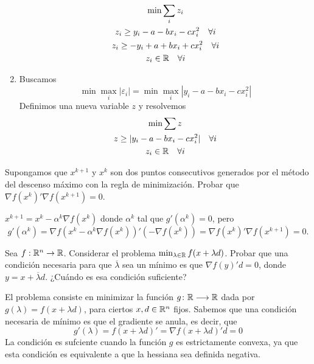 \documentclass[twoside]{article}
\begin{document}
\begin{ejercicio}{1}
\begin{solucion}
\begin{enumerate}
\begin{gather*}
\min \sum_i z_i\\
z_i\geq y_i -a-bx_i-c x_i^2 \quad \forall i \\
z_i\geq -y_i +a+bx_i+c x_i^2 \quad \forall i\\
z_i \in \mathbb{R} \quad \forall i
\end{gather*}
\item Buscamos
$$
\min \max_i |\varepsilon_i| = \min \max_i |y_i -a-bx_i-c x_i^2|
$$
Definimos una nueva variable $z$ y resolvemos
\begin{gather*}
\min \sum z\\
z\geq |y_i -a-bx_i-c x_i^2| \quad \forall i\\
z_i \in \mathbb{R} \quad \forall i
\end{gather*}
\end{enumerate}
\end{solucion}
\end{ejercicio}

\newpage 

\begin{ejercicio}{2}
Supongamos que $x^{k+1}$ y $x^k$ son dos puntos consecutivos generados por el método del descenso máximo con la regla de minimización. Probar que $\nabla f(x^{k})'\nabla f(x^{k+1})=0$.
\end{ejercicio}
\begin{solucion}
$x^{k+1}=x^k-\alpha^k\nabla f(x^k)$ donde $\alpha^k$ tal que $g'(\alpha^k)=0$, pero $$g'(\alpha^k)=\nabla f(x^k-\alpha^k\nabla f(x^k))'(-\nabla f(x^k))=\nabla f(x^{k})'\nabla f(x^{k+1})=0.$$
\end{solucion}

\newpage

\begin{ejercicio}{3}
Sea $f:\mathbb{R}^n\to\mathbb{R}$. Considerar el problema $\min_{\lambda\in\mathbb{R}}f(x+\lambda d)$. Probar que una condición necesaria para que $\overline{\lambda}$ sea un mínimo es que $\nabla f(y)'d=0$, donde $y=x+\overline{\lambda}d$. ¿Cuándo es esa condición suficiente?
\begin{solucion}
El problema consiste en minimizar la función $g\colon{\mathbb{R}}\longrightarrow{\mathbb{R}}$ dada por $g(\lambda) = f(x+\lambda d)$, para ciertos $x,d\in\mathbb{R}^n$ fijos. Sabemos que una condición necesaria de mínimo es que el gradiente se anula, es decir, que
$$
g'(\lambda) = f(x+\lambda d)' = \nabla f(x+\lambda d)'d = 0
$$
La condición es sufciente cuando la función $g$ es estrictamente convexa, ya que esta condición es equivalente a que la hessiana sea definida negativa.
\end{solucion}
\end{ejercicio}
\end{document}
